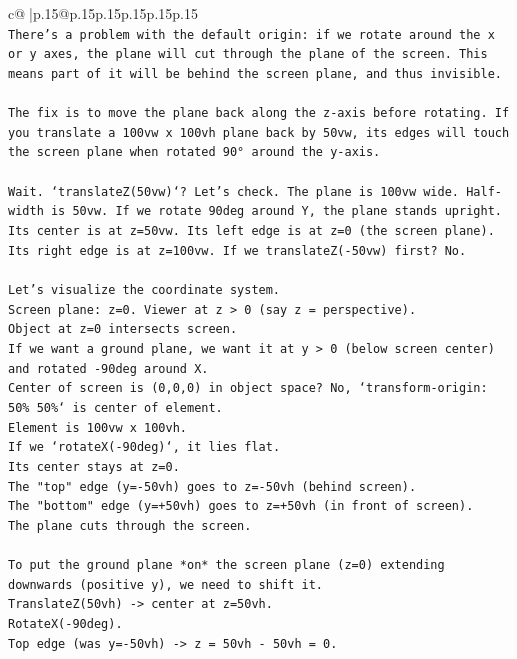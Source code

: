 \documentclass{article}
\begin{document}
{\begin{supertabular}{c@{$\;$}|p{.15\linewidth}@{}p{.15\linewidth}p{.15\linewidth}p{.15\linewidth}p{.15\linewidth}p{.15\linewidth}}
{{{\\ 
\texttt{There's a problem with the default origin: if we rotate around the x or y axes, the plane will cut through the plane of the screen. This means part of it will be behind the screen plane, and thus invisible.} \\
\\ 
\texttt{The fix is to move the plane back along the z{-}axis before rotating. If you translate a 100vw x 100vh plane back by 50vw, its edges will touch the screen plane when rotated 90° around the y{-}axis.} \\
\\ 
\texttt{Wait. `translateZ(50vw)`? Let's check. The plane is 100vw wide. Half{-}width is 50vw. If we rotate 90deg around Y, the plane stands upright. Its center is at z=50vw. Its left edge is at z=0 (the screen plane). Its right edge is at z=100vw. If we translateZ({-}50vw) first? No.} \\
\\ 
\texttt{Let's visualize the coordinate system.} \\
\texttt{Screen plane: z=0. Viewer at z > 0 (say z = perspective).} \\
\texttt{Object at z=0 intersects screen.} \\
\texttt{If we want a ground plane, we want it at y > 0 (below screen center) and rotated {-}90deg around X.} \\
\texttt{Center of screen is (0,0,0) in object space? No, `transform{-}origin: 50\% 50\%` is center of element.} \\
\texttt{Element is 100vw x 100vh.} \\
\texttt{If we `rotateX({-}90deg)`, it lies flat.} \\
\texttt{Its center stays at z=0.} \\
\texttt{The "top" edge (y={-}50vh) goes to z={-}50vh (behind screen).} \\
\texttt{The "bottom" edge (y=+50vh) goes to z=+50vh (in front of screen).} \\
\texttt{The plane cuts through the screen.} \\
\\ 
\texttt{To put the ground plane *on* the screen plane (z=0) extending downwards (positive y), we need to shift it.} \\
\texttt{TranslateZ(50vh) {-}> center at z=50vh.} \\
\texttt{RotateX({-}90deg).} \\
\texttt{Top edge (was y={-}50vh) {-}> z = 50vh {-} 50vh = 0.} \\
}}}
\end{supertabular}}
\end{document}
